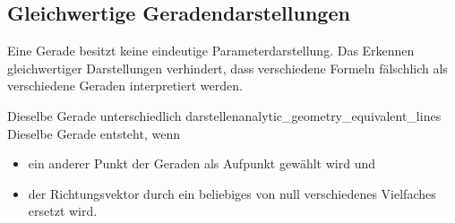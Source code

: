 \subsection{Gleichwertige Geradendarstellungen}
\label{subsec:analytic_geometry_equivalent_line_representations}

Eine Gerade besitzt keine eindeutige Parameterdarstellung. Das Erkennen
gleichwertiger Darstellungen verhindert, dass verschiedene Formeln
fälschlich als verschiedene Geraden interpretiert werden.

\begin{KeyPointBox}{Dieselbe Gerade unterschiedlich darstellen}{analytic_geometry_equivalent_lines}
  Dieselbe Gerade entsteht, wenn
  \begin{itemize}[leftmargin=1.6em,itemsep=0.4em]
    \item ein anderer Punkt der Geraden als Aufpunkt gewählt wird und
    \item der Richtungsvektor durch ein beliebiges von null verschiedenes
      Vielfaches ersetzt wird.
  \end{itemize}
\end{KeyPointBox}

\noindent
\begin{minipage}[t]{0.32\linewidth}
  \centering
  \begingroup
    \def\LineUnit{0.62}
    \def\LineSupportX{2}\def\LineSupportY{2}
    \def\LineDirectionX{1}\def\LineDirectionY{-1}
    \def\LineLambdaMin{-2}\def\LineLambdaMax{2}
  \endgroup
\end{minipage}\hfill
\begin{minipage}[t]{0.32\linewidth}
  \centering
  \begingroup
    \def\LineUnit{0.62}
    \def\LineSupportX{1}\def\LineSupportY{3}
    \def\LineDirectionX{1}\def\LineDirectionY{-1}
    \def\LineLambdaMin{-1}\def\LineLambdaMax{3}
  \endgroup
\end{minipage}\hfill
\begin{minipage}[t]{0.32\linewidth}
  \centering
  \begingroup
    \def\LineUnit{0.62}
    \def\LineSupportX{2}\def\LineSupportY{2}
    \def\LineDirectionX{-1}\def\LineDirectionY{1}
    \def\LineLambdaMin{-2}\def\LineLambdaMax{2}
  \endgroup
\end{minipage}

